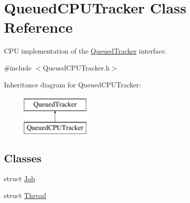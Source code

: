 \hypertarget{class_queued_c_p_u_tracker}{}\section{Queued\+C\+P\+U\+Tracker Class Reference}
\label{class_queued_c_p_u_tracker}


C\+PU implementation of the \hyperlink{class_queued_tracker}{Queued\+Tracker} interface.  




{\ttfamily \#include $<$Queued\+C\+P\+U\+Tracker.\+h$>$}

Inheritance diagram for Queued\+C\+P\+U\+Tracker\+:\begin{figure}[H]
\begin{center}
\leavevmode
\includegraphics[height=2.000000cm]{class_queued_c_p_u_tracker}
\end{center}
\end{figure}
\subsection*{Classes}
\begin{DoxyCompactItemize}
\item 
struct \hyperlink{struct_queued_c_p_u_tracker_1_1_job}{Job}
\item 
struct \hyperlink{struct_queued_c_p_u_tracker_1_1_thread}{Thread}
\end{DoxyCompactItemize}
